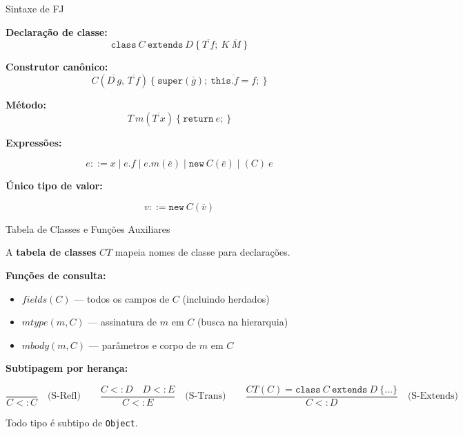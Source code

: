 \begin{frame}{Sintaxe de FJ}

    \textbf{Declaração de classe:}
    \[\mathtt{class}\ C\ \mathtt{extends}\ D\ \{\ \overline{T\ f};\ K\ \overline{M}\ \}\]

    \textbf{Construtor canônico:}
    \[C(\overline{D\ g},\, \overline{T\ f})\ \{\ \mathtt{super}(\bar{g});\ \overline{\mathtt{this}.f = f};\ \}\]

    \textbf{Método:} \[T\ m(\overline{T\ x})\ \{\ \mathtt{return}\ e;\ \}\]

    \textbf{Expressões:}

    \[e ::= x \mid e.f \mid e.m(\bar{e}) \mid \mathtt{new}\ C(\bar{e}) \mid (C)\ e\]

    \textbf{Único tipo de valor:}

    \[v ::= \mathtt{new}\ C(\bar{v})\]
\end{frame}

\begin{frame}[fragile]{Tabela de Classes e Funções Auxiliares}

    A \textbf{tabela de classes} \(\mathit{CT}\) mapeia nomes de classe para
    declarações.

    \textbf{Funções de consulta:}

    \begin{itemize}

        \item
        \(\mathit{fields}(C)\) --- todos os campos de \(C\) (incluindo
        herdados)
        \item
        \(\mathit{mtype}(m, C)\) --- assinatura de \(m\) em \(C\) (busca na
        hierarquia)
        \item
        \(\mathit{mbody}(m, C)\) --- parâmetros e corpo de \(m\) em \(C\)
    \end{itemize}

    \textbf{Subtipagem por herança:}

    \[\frac{}{C <: C} \quad\text{(S-Refl)} \qquad \frac{C <: D \quad D <: E}{C <: E} \quad\text{(S-Trans)} \qquad \frac{\mathit{CT}(C) = \mathtt{class}\ C\ \mathtt{extends}\ D\ \{\ldots\}}{C <: D} \quad\text{(S-Extends)}\]

    Todo tipo é subtipo de \texttt{Object}.
\end{frame}

